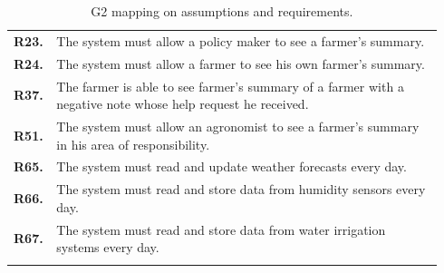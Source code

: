 \begin{longtable}{p{0.06\linewidth} p{0.88\linewidth}}
	\textbf{R23.} & The system must allow a policy maker to see a farmer's summary.\\
	
	\textbf{R24.} & The system must allow a farmer to see his own farmer's summary.\\
	\textbf{R37.} & The farmer is able to see farmer's summary of a farmer with a negative note whose help request he received. \\

	\textbf{R51.} & The system must allow an agronomist to see a farmer's summary in his area of responsibility.\\

	\textbf{R65.} & The system must read and update weather forecasts every day. \\
	\textbf{R66.} & The system must read and store data from humidity sensors every day. \\
	\textbf{R67.} & The system must read and store data from water irrigation systems every day. \\
    \bottomrule
    \caption{G2 mapping on assumptions and requirements.}
\end{longtable}

